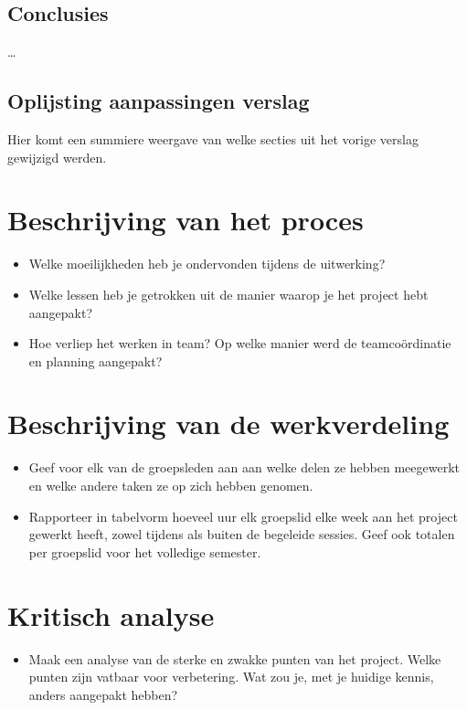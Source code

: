 \documentclass[tt1]{penoverslag}
\begin{document}
\subsection{Conclusies}
\ldots

\subsection{Oplijsting aanpassingen verslag}
Hier komt een summiere weergave van welke secties uit het vorige verslag gewijzigd werden.





\section{Beschrijving van het proces}
\begin{itemize}
\item Welke moeilijkheden heb je ondervonden tijdens de uitwerking?
\item Welke lessen heb je getrokken uit de manier waarop je het project hebt aangepakt?
\item Hoe verliep het werken in team? Op welke manier werd de teamco\"ordinatie en planning aangepakt?
\end{itemize}


\section{Beschrijving van de werkverdeling}
\begin{itemize}
\item Geef voor elk van de groepsleden aan aan welke delen ze hebben meegewerkt en welke andere taken ze op zich hebben genomen.
\item Rapporteer in tabelvorm hoeveel uur elk groepslid elke week aan het project gewerkt heeft, zowel tijdens als buiten de begeleide sessies. Geef ook totalen per groepslid voor het volledige semester.
\end{itemize}


\section{Kritisch analyse}
\begin{itemize}
\item Maak een analyse van de sterke en zwakke punten van het project. Welke punten zijn vatbaar voor verbetering. Wat zou je, met je huidige kennis, anders aangepakt hebben?
\end{itemize}



\newpage


\end{document}
